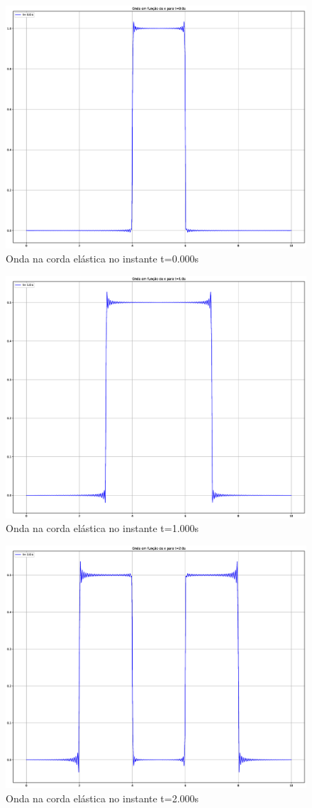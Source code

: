 \documentclass[12pt, a4paper, portuguese]{fphw}
\begin{document}
\begin{figure}[H]
	\centering
	\includegraphics[width=.8\linewidth]{"graficos/grafico_t=0.000s"}
	\caption{Onda na corda elástica no instante t=0.000s}
	\label{fig:grafico-t0}
\end{figure}

\begin{figure}[H]
	\centering
	\includegraphics[width=.8\linewidth]{"graficos/grafico_t=1.000s"}
	\caption{Onda na corda elástica no instante t=1.000s}
	\label{fig:grafico-t1}
\end{figure}

\begin{figure}[H]
	\centering
	\includegraphics[width=.8\linewidth]{"graficos/grafico_t=2.000s"}
	\caption{Onda na corda elástica no instante t=2.000s}
	\label{fig:grafico-t2}
\end{figure}
\end{document}
